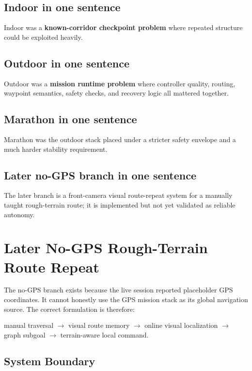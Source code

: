 \documentclass[11pt]{article}
\begin{document}
\subsection{Indoor in one sentence}

Indoor was a \textbf{known-corridor checkpoint problem} where repeated structure
could be exploited heavily.

\subsection{Outdoor in one sentence}

Outdoor was a \textbf{mission runtime problem} where controller quality, routing,
waypoint semantics, safety checks, and recovery logic all mattered together.

\subsection{Marathon in one sentence}

Marathon was the outdoor stack placed under a stricter safety envelope and a much
harder stability requirement.

\subsection{Later no-GPS branch in one sentence}

The later branch is a front-camera visual route-repeat system for a manually
taught rough-terrain route; it is implemented but not yet validated as reliable
autonomy.

\section{Later No-GPS Rough-Terrain Route Repeat}

The no-GPS branch exists because the live session reported placeholder GPS
coordinates. It cannot honestly use the GPS mission stack as its global
navigation source. The correct formulation is therefore:

\begin{center}
manual traversal $\rightarrow$ visual route memory $\rightarrow$ online visual
localization $\rightarrow$ graph subgoal $\rightarrow$ terrain-aware local command.
\end{center}

\subsection{System Boundary}
\end{document}

